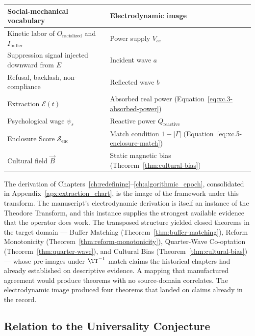 \begin{center}
\renewcommand{\arraystretch}{1.3}
\begin{tabular}{>{\raggedright}p{6.2cm} >{\raggedright\arraybackslash}p{7.2cm}}
\toprule
\textbf{Social-mechanical vocabulary} & \textbf{Electrodynamic image} \\
\midrule
Kinetic labor of $O_{\text{racialized}}$ and $I_{\text{buffer}}$ & Power supply $V_{cc}$ \\
Suppression signal injected downward from $E$ & Incident wave $a$ \\
Refusal, backlash, non-compliance & Reflected wave $b$ \\
Extraction $\mathcal{E}(t)$ & Absorbed real power (Equation~\ref{eq:xc.3-absorbed-power}) \\
Psychological wage $\psi_s$ & Reactive power $Q_{\text{reactive}}$ \\
Enclosure Score $\mathcal{S}_{\text{enc}}$ & Match condition $1 - |\Gamma|$
(Equation~\ref{eq:xc.5-enclosure-match}) \\
Cultural field $\vec{B}$ & Static magnetic bias (Theorem~\ref{thm:cultural-bias}) \\
\bottomrule
\end{tabular}
\end{center}

The derivation of Chapters~\ref{ch:redefining}--\ref{ch:algorithmic_epoch}, consolidated in
Appendix~\ref{apx:extraction_chart}, is the image of the framework under this transform. The
manuscript's electrodynamic derivation is itself an instance of the Theodore Transform, and this
instance supplies the strongest available evidence that the operator does work. The transposed
structure yielded closed theorems in the target domain --- Buffer Matching
(Theorem~\ref{thm:buffer-matching}), Reform Monotonicity
(Theorem~\ref{thm:reform-monotonicity}), Quarter-Wave Co-optation
(Theorem~\ref{thm:quarter-wave}), and Cultural Bias (Theorem~\ref{thm:cultural-bias}) --- whose
pre-images under $\TT^{-1}$ match claims the historical chapters had already established
on descriptive evidence. A mapping that manufactured agreement would produce theorems with no
source-domain correlates. The electrodynamic image produced four theorems that landed on claims
already in the record.

\subsection{Relation to the Universality Conjecture}

